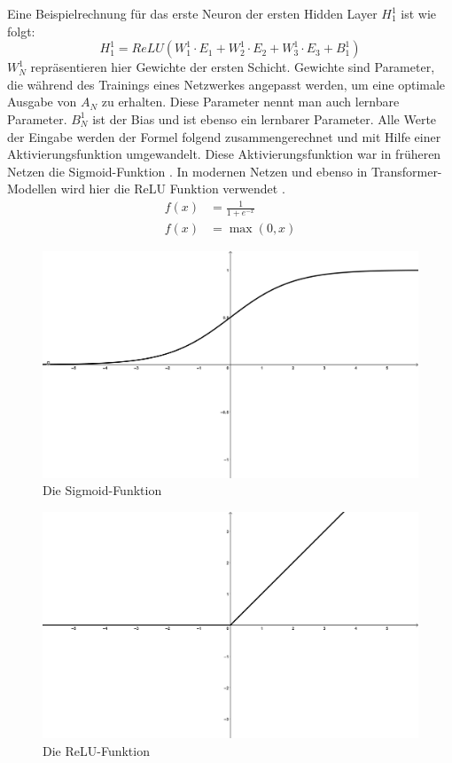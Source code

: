 Eine Beispielrechnung für das erste Neuron der ersten Hidden Layer $H^1_1$ ist wie folgt:
\begin{equation}
    H^1_1=ReLU(W^1_1\cdot E_1 + W^1_2\cdot E_2 + W^1_3\cdot E_3 + B^1_1)
\end{equation}
$W^1_N$ repräsentieren hier Gewichte der ersten Schicht.
Gewichte sind Parameter, die während des Trainings eines Netzwerkes angepasst werden, um eine optimale Ausgabe von $A_N$ zu erhalten.
Diese Parameter nennt man auch lernbare Parameter.
$B^1_N$ ist der Bias und ist ebenso ein lernbarer Parameter.
Alle Werte der Eingabe werden der Formel folgend zusammengerechnet und mit Hilfe einer Aktivierungsfunktion umgewandelt.
Diese Aktivierungsfunktion war in früheren Netzen die Sigmoid-Funktion .
In modernen Netzen und ebenso in Transformer-Modellen wird hier die ReLU Funktion verwendet .
\begin{align}
    f(x) &= \frac{1}{1+e^{-x}}\label{eq:sigmoid}\\
    f(x) &= \max(0,x) \label{eq:relu}
\end{align}

\begin{figure}
    \centering
    \includegraphics[width=\textwidth]{zeichnungen/sigmoid.png}
    \caption{Die Sigmoid-Funktion}\label{img:sigmoid}
\end{figure}

\begin{figure}
    \centering
    \includegraphics[width=\textwidth]{zeichnungen/relu.png}
    \caption{Die ReLU-Funktion}\label{img:relu}
\end{figure}

